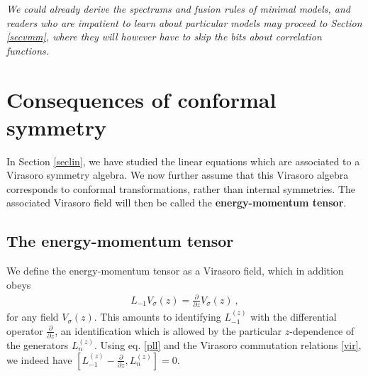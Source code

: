 \documentclass[12pt, a4paper, notitlepage, twoside]{report}
\numberwithin{equation}{section}
\theoremstyle{break}
\begin{document}
\vspace{2mm} 
 
\textit{We could already derive the spectrums and fusion rules of minimal models, and readers who are impatient to learn about particular models may proceed to Section \ref{secvmm}, where they will however have to skip the bits about correlation functions.} 


\section{Consequences of conformal symmetry \label{secem}}

In Section \ref{seclin}, we have studied the linear equations which are associated to a Virasoro symmetry algebra.
We now further assume that this Virasoro algebra corresponds to conformal transformations, rather than internal symmetries.
The associated 
Virasoro field will then be called the \textbf{\boldmath energy-momentum tensor}. 

\subsection{The energy-momentum tensor}

We define the energy-momentum tensor as a Virasoro field, which in addition obeys
\begin{align}
 \boxed{L_{-1} V_\sigma (z) = {\frac{\partial}{\partial z}} V_\sigma(z)} \ ,
\label{lvpv}
\end{align}
for any field $V_\sigma(z)$.
This amounts to identifying $L_{-1}^{(z)}$ with the differential operator ${\frac{\partial}{\partial z}}$, an identification which is allowed by the particular $z$-dependence of the generators $L_n^{(z)}$.
Using eq. \eqref{pll} and the Virasoro commutation relations \eqref{vir}, we indeed have $[L_{-1}^{(z)}-{\frac{\partial}{\partial z}},L_n^{(z)}]=0$. 
\end{document}
